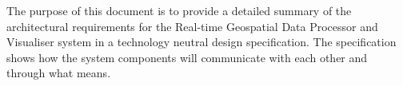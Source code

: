 The purpose of this document is to provide a detailed summary of the architectural requirements for the Real-time Geospatial Data Processor and Visualiser system in a technology neutral design specification. The specification shows how the system components will communicate with each other and through what means.